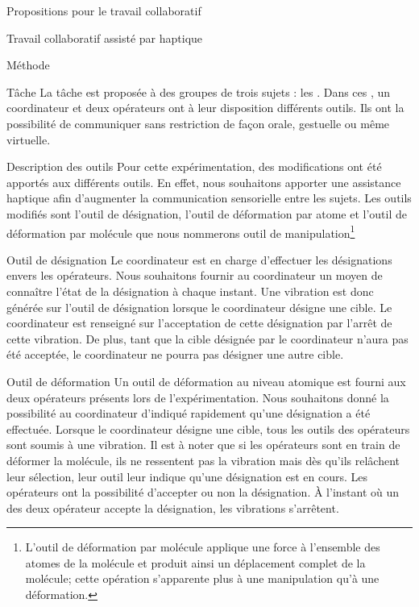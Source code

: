 \documentclass[myfrancais]{mythesis}
\begin{document}
\begin{mypart}{Propositions pour le travail collaboratif}
\begin{mychapter}{Travail collaboratif assisté par haptique}
\begin{mysection}{Méthode}
\begin{mysubsection}{Tâche}
					La tâche est proposée à des groupes de trois sujets : les .
					Dans ces , un \og coordinateur \fg et deux \og opérateurs \fg ont à leur disposition différents outils.
					Ils ont la possibilité de communiquer sans restriction de façon orale, gestuelle ou même virtuelle.
					\begin{mysubsubsection}{Description des outils}
						Pour cette expérimentation, des modifications ont été apportés aux différents outils.
						En effet, nous souhaitons apporter une assistance haptique afin d'augmenter la communication sensorielle entre les sujets.
						Les outils modifiés sont l'outil de désignation, l'outil de déformation par atome et l'outil de déformation par molécule que nous nommerons outil de manipulation\footnote{L'outil de déformation par molécule applique une force à l'ensemble des atomes de la molécule et produit ainsi un déplacement complet de la molécule; cette opération s'apparente plus à une manipulation qu'à une déformation.}
						\begin{myparagraph}{Outil de désignation}
							Le coordinateur est en charge d'effectuer les désignations envers les opérateurs.
							Nous souhaitons fournir au coordinateur un moyen de connaître l'état de la désignation à chaque instant.
							Une vibration est donc générée sur l'outil de désignation lorsque le coordinateur désigne une cible.
							Le coordinateur est renseigné sur l'acceptation de cette désignation par l'arrêt de cette vibration.
							De plus, tant que la cible désignée par le coordinateur n'aura pas été acceptée, le coordinateur ne pourra pas désigner une autre cible.
						\end{myparagraph}
						\begin{myparagraph}{Outil de déformation}
							Un outil de déformation au niveau atomique est fourni aux deux opérateurs présents lors de l'expérimentation.
							Nous souhaitons donné la possibilité au coordinateur d'indiqué rapidement qu'une désignation a été effectuée.
							Lorsque le coordinateur désigne une cible, tous les outils des opérateurs sont soumis à une vibration.
							Il est à noter que si les opérateurs sont en train de déformer la molécule, ils ne ressentent pas la vibration mais dès qu'ils relâchent leur sélection, leur outil leur indique qu'une désignation est en cours.
							Les opérateurs ont la possibilité d'accepter ou non la désignation.
							À l'instant où un des deux opérateur accepte la désignation, les vibrations s'arrêtent.

\end{myparagraph}
\end{mysubsubsection}
\end{mysubsection}
\end{mysection}
\end{mychapter}
\end{mypart}
\end{document}
